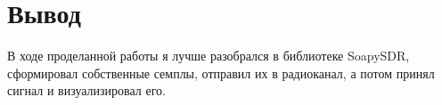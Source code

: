 \chapter{Вывод}
\label{ch:chap3}

В ходе проделанной работы я лучше разобрался в библиотеке SoapySDR, сформировал собственные семплы, отправил их в радиоканал, а потом принял сигнал и визуализировал его.

\endinput